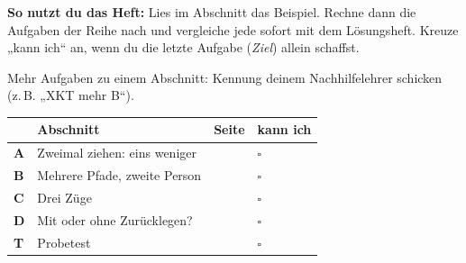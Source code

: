 \documentclass[11pt]{article}
\begin{document}
\par\smallskip
{}\par\medskip
\noindent\textbf{So nutzt du das Heft:} Lies im Abschnitt das Beispiel. Rechne dann die Aufgaben der Reihe nach und vergleiche jede sofort mit dem Lösungsheft. Kreuze „kann ich“ an, wenn du die letzte Aufgabe (\emph{Ziel}) allein schaffst.\par
\noindent Mehr Aufgaben zu einem Abschnitt: Kennung deinem Nachhilfelehrer schicken (z.\,B. „XKT mehr B“).\par\medskip
{\renewcommand{\arraystretch}{1.3}
\noindent\begin{tabular}{|>{\bfseries}p{10mm}|p{112mm}|>{\raggedleft\arraybackslash}p{10mm}|>{\centering\arraybackslash}p{14mm}|}\hline
\rowcolor{black!8} & \textbf{Abschnitt} & \textbf{Seite} & \textbf{kann ich}\\\hline
A & Zweimal ziehen: eins weniger & \pageref{s:A} & $\square$\\\hline
B & Mehrere Pfade, zweite Person & \pageref{s:B} & $\square$\\\hline
C & Drei Züge & \pageref{s:C} & $\square$\\\hline
D & Mit oder ohne Zurücklegen? & \pageref{s:D} & $\square$\\\hline
T & Probetest & \pageref{s:T} & $\square$\\\hline
\end{tabular}}\par\bigskip
\end{document}
